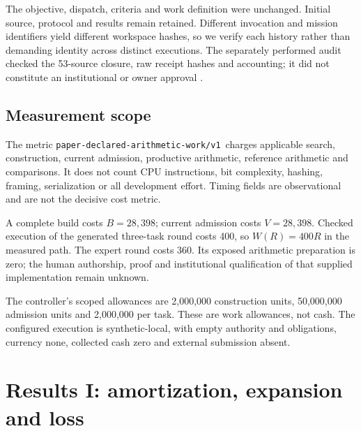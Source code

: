 \documentclass[11pt,a4paper]{article}
\newcommand{\metric}{\texttt{paper-declared-arithmetic-work/v1}}
\begin{document}
The objective, dispatch, criteria and work definition were unchanged. Initial source, protocol and results remain retained. Different invocation and mission identifiers yield different workspace hashes, so we verify each history rather than demanding identity across distinct executions. The separately performed audit checked the 53-source closure, raw receipt hashes and accounting; it did not constitute an institutional or owner approval \cite{compoundingdata}.

\subsection{Measurement scope}
The metric \metric\ charges applicable search, construction, current admission, productive arithmetic, reference arithmetic and comparisons. It does not count CPU instructions, bit complexity, hashing, framing, serialization or all development effort. Timing fields are observational and are not the decisive cost metric.

A complete build costs \(B=28{,}398\); current admission costs \(V=28{,}398\). Checked execution of the generated three-task round costs 400, so \(W(R)=400R\) in the measured path. The expert round costs 360. Its exposed arithmetic preparation is zero; the human authorship, proof and institutional qualification of that supplied implementation remain unknown.

The controller's scoped allowances are 2,000,000 construction units, 50,000,000 admission units and 2,000,000 per task. These are work allowances, not cash. The configured execution is synthetic-local, with empty authority and obligations, currency none, collected cash zero and external submission absent.

\section{Results I: amortization, expansion and loss}\label{sec:mathresults}
\end{document}
